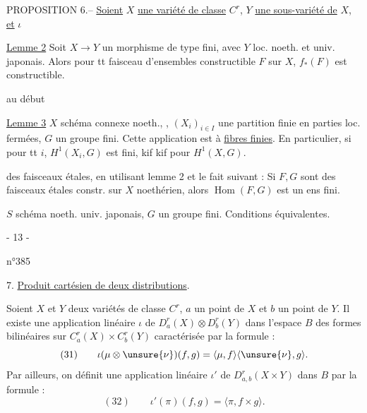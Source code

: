 PROPOSITION 6.-- \uline{Soient} $X$ \uline{une variété de classe} $C^r$, $Y$ \uline{une sous-variété de} $X$, \uline{et} $\iota$

\uline{Lemme 2} Soit $X\to Y$ un morphisme de type fini, avec $Y$ loc. noeth. et univ. japonais.
Alors pour tt faisceau d'ensembles constructible $F$ sur $X$, $f_*(F)$ est constructible.

 au début

\uline{Lemme 3} $X$ schéma connexe  noeth.,
,
$(X_i)_{i\in I}$ une partition finie en parties loc. fermées, $G$ un groupe fini.
Cette application est à \uline{fibres finies}. En particulier, si pour tt $i$, $H^1(X_i,G)$ est fini, kif kif pour $H^1(X,G)$.

 des faisceaux étales, en utilisant lemme 2 et le fait suivant :
Si $F,G$ sont des faisceaux  étales constr. sur $X$ noethérien, alors $\operatorname{Hom}(F,G)$ est un ens fini.

$S$  schéma noeth. univ. japonais,
$G$ un groupe fini. Conditions équivalentes.

\begin{center}- 13 -\end{center}
\begin{flushright}n°385\end{flushright}
7. \uline{Produit cartésien de deux distributions}.

Soient $X$ et $Y$ deux variétés de classe $C^r$, $a$ un point de $X$ et $b$ un point de $Y$.
Il existe une application linéaire $\iota$ de $D_a^r(X)\otimes D_b^r(Y)$ dans l'espace $B$ des formes bilinéaires sur $C_a^r(X)\times C_b^r(Y)$ caractérisée par la formule :
\[
(31)\qquad \iota(\mu\otimes\unsure{\nu})(f,g)=\langle\mu,f\rangle\langle\unsure{\nu},g\rangle.
\]
Par ailleurs, on définit une application linéaire $\iota'$ de $D_{a,b}^r(X\times Y)$ dans $B$ par la formule :
\[
(32)\qquad \iota'(\pi)(f,g)=\langle\pi,f\times g\rangle.
\]

